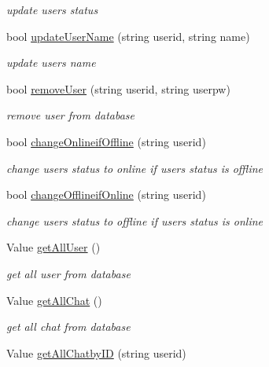 \begin{DoxyCompactItemize}
\begin{DoxyCompactList}\small\item\em update user\textquotesingle{}s status \end{DoxyCompactList}\item 
bool \mbox{\hyperlink{class_d_b_manager_a5778a4df0fe537979dc09a1265a4abee}{update\+User\+Name}} (string userid, string name)
\begin{DoxyCompactList}\small\item\em update user\textquotesingle{}s name \end{DoxyCompactList}\item 
bool \mbox{\hyperlink{class_d_b_manager_a0af0724f0b21b7e33062b93bd700ded6}{remove\+User}} (string userid, string userpw)
\begin{DoxyCompactList}\small\item\em remove user from database \end{DoxyCompactList}\item 
bool \mbox{\hyperlink{class_d_b_manager_a51bb4bba0e60fecca52f93c93063fa90}{change\+Onlineif\+Offline}} (string userid)
\begin{DoxyCompactList}\small\item\em change user\textquotesingle{}s status to online if user\textquotesingle{}s status is offline \end{DoxyCompactList}\item 
bool \mbox{\hyperlink{class_d_b_manager_a7e404783a429de457f15b354bc40eb57}{change\+Offlineif\+Online}} (string userid)
\begin{DoxyCompactList}\small\item\em change user\textquotesingle{}s status to offline if user\textquotesingle{}s status is online \end{DoxyCompactList}\item 
Value \mbox{\hyperlink{class_d_b_manager_a0171d3489ef375c9eeff4014a4a485de}{get\+All\+User}} ()
\begin{DoxyCompactList}\small\item\em get all user from database \end{DoxyCompactList}\item 
Value \mbox{\hyperlink{class_d_b_manager_a546cf5b82fe9cb115cfee8d52f90f0da}{get\+All\+Chat}} ()
\begin{DoxyCompactList}\small\item\em get all chat from database \end{DoxyCompactList}\item 
Value \mbox{\hyperlink{class_d_b_manager_af90bbc5f97ee7bb051006178c5e6834b}{get\+All\+Chatby\+ID}} (string userid)

\end{DoxyCompactItemize}
